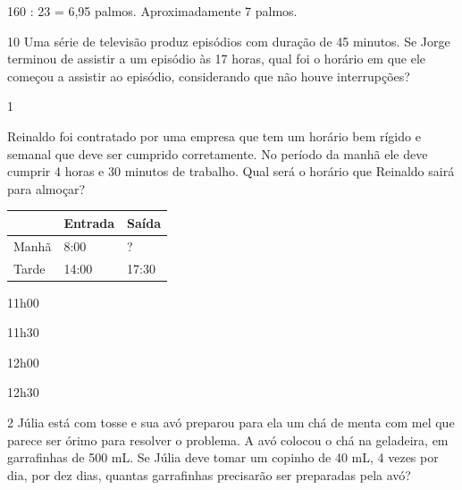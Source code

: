 \begin{multicols}{2}
{160 : 23 = 6,95 palmos. Aproximadamente 7 palmos.}

\num{10} Uma série de televisão produz episódios com duração de 45 minutos.
Se Jorge terminou de assistir a um episódio às 17 horas, qual foi o
horário em que ele começou a assistir ao episódio, considerando que não houve interrupções?



\num{1}

Reinaldo foi contratado por uma empresa que tem um horário bem rígido
e semanal que deve ser cumprido corretamente. No período da manhã ele deve
cumprir 4 horas e 30 minutos de trabalho. Qual será o horário que
Reinaldo sairá para almoçar?

\begin{longtable}[]{@{}lll@{}}
\toprule
& Entrada & Saída\tabularnewline
\midrule
\endhead
Manhã & 8:00 & ?\tabularnewline
Tarde & 14:00 & 17:30\tabularnewline
\bottomrule
\end{longtable}

\begin{minipage}{.5\textwidth}
\begin{escolha}
\item
  11h00
\item
  11h30
\item
  12h00
\item
  12h30
\end{escolha}
\end{minipage}

\num{2} Júlia está com tosse e sua avó preparou para ela um chá de menta com mel que parece ser órimo para resolver o problema. A avó colocou o chá na geladeira, em garrafinhas de 500 mL. Se Júlia deve tomar um copinho de 40 mL, 4 vezes por dia, por dez dias, quantas garrafinhas precisarão ser preparadas pela avó?

\begin{minipage}{.5\textwidth}
\begin{escolha}


\end{escolha}
\end{minipage}
\end{multicols}
